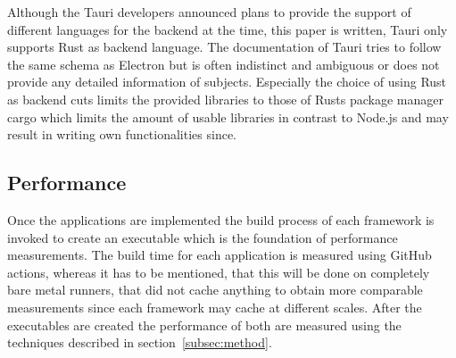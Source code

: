 Although the Tauri developers announced plans to provide the support of different languages for the backend at the time, this paper is written, Tauri only supports Rust as backend language.
The documentation of Tauri tries to follow the same schema as Electron but is often indistinct and ambiguous or does not provide any detailed information of subjects.
Especially the choice of using Rust as backend cuts limits the provided libraries to those of Rusts package manager cargo which limits the amount of usable libraries in contrast to Node.js and may result in writing
own functionalities since.

\subsection{Performance}
\label{subsec:impl:performance}
Once the applications are implemented the build process of each framework is invoked to create an executable which is the foundation of performance measurements.
The build time for each application is measured using GitHub actions, whereas it has to be mentioned, that this will be done on completely bare metal runners, that did not cache anything to obtain more comparable measurements
since each framework may cache at different scales.
After the executables are created the performance of both are measured using the techniques described in section~\ref{subsec:method}.

